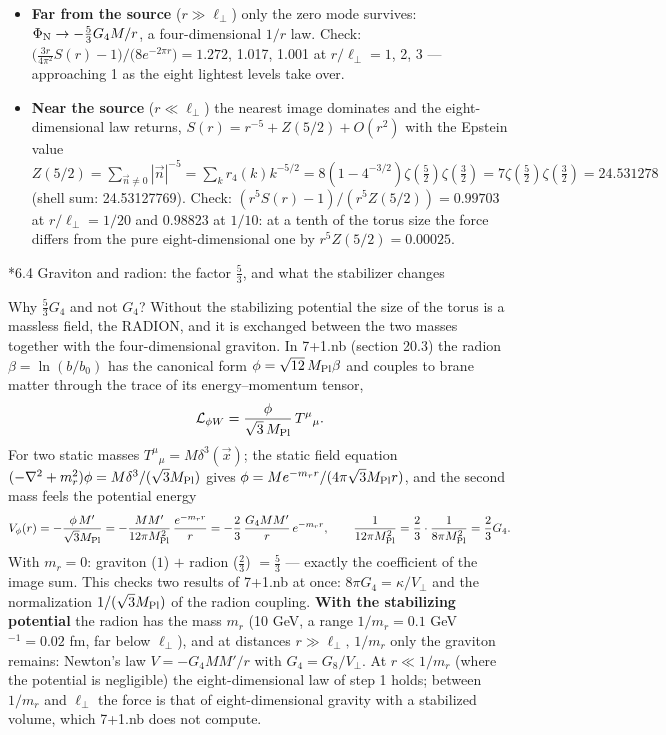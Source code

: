 \documentclass[10pt,a4paper]{article}
\makeatletter
\renewcommand\subsection{\@startsection{subsection}{2}{\z@}{-3.25ex\@plus -1ex \@minus -.2ex}{1.5ex \@plus .2ex}{\normalfont\large\bfseries\raggedright}}
\makeatother
\begin{document}
\begin{itemize}
\item \textbf{Far from the source} ($r\gg\ell_\perp$) only the zero mode survives: $\Phi_{\rm N}\to-\frac53G_4M/r$, a four-dimensional $1/r$ law. Check: $\big(\frac{3r}{4\pi^2}S(r)-1\big)\big/\big(8e^{-2\pi r}\big)=1.272$, 1.017, 1.001 at $r/\ell_\perp=1$, 2, 3 — approaching 1 as the eight lightest levels take over.
\item \textbf{Near the source} ($r\ll\ell_\perp$) the nearest image dominates and the eight-dimensional law returns, $S(r)=r^{-5}+Z(5/2)+O(r^2)$ with the Epstein value $Z(5/2)=\sum_{\vec n\ne0}|\vec n|^{-5}=\sum_kr_4(k)k^{-5/2}=8(1-4^{-3/2})\zeta(\tfrac52)\zeta(\tfrac32)=7\zeta(\tfrac52)\zeta(\tfrac32)=24.531278$ (shell sum: 24.53127769). Check: $(r^5S(r)-1)/(r^5Z(5/2))=0.99703$ at $r/\ell_\perp=1/20$ and 0.98823 at $1/10$: at a tenth of the torus size the force differs from the pure eight-dimensional one by $r^5Z(5/2)=0.00025$.
\end{itemize}
\subsection*{6.4 Graviton and radion: the factor \texorpdfstring{$\frac53$}{53}, and what the stabilizer changes}
Why $\frac53G_4$ and not $G_4$? Without the stabilizing potential the size of the torus is a massless field, the RADION, and it is exchanged between the two masses together with the four-dimensional graviton. In 7+1.nb (section 20.3) the radion $\beta=\ln(b/b_0)$ has the canonical form $\phi=\sqrt{12}\,M_{\rm Pl}\beta$ and couples to brane matter through the trace of its energy–momentum tensor,
\begin{equation*}
\mathcal L_{\phi W}=\frac{\phi}{\sqrt3\,M_{\rm Pl}}\,T^\mu{}_\mu .
\end{equation*}
For two static masses $T^\mu{}_\mu=M\delta^3(\vec x)$; the static field equation $(-\nabla^2+m_r^2)\phi=M\delta^3/(\sqrt3M_{\rm Pl})$ gives $\phi=Me^{-m_rr}/(4\pi\sqrt3M_{\rm Pl}r)$, and the second mass feels the potential energy
\begin{equation*}
V_\phi(r)=-\frac{\phi\,M'}{\sqrt3M_{\rm Pl}}=-\frac{MM'}{12\pi M_{\rm Pl}^2}\,\frac{e^{-m_rr}}r=-\frac23\,\frac{G_4MM'}{r}\,e^{-m_rr},\qquad \frac1{12\pi M_{\rm Pl}^2}=\frac23\cdot\frac1{8\pi M_{\rm Pl}^2}=\frac23G_4 .
\end{equation*}
With $m_r=0$: graviton ($1$) $+$ radion ($\frac23$) $=\frac53$ — exactly the coefficient of the image sum. This checks two results of 7+1.nb at once: $8\pi G_4=\kappa/V_\perp$ and the normalization $1/(\sqrt3M_{\rm Pl})$ of the radion coupling. \textbf{With the stabilizing potential} the radion has the mass $m_r$ (10 GeV, a range $1/m_r=0.1$ GeV$^{-1}=0.02$ fm, far below $\ell_\perp$), and at distances $r\gg\ell_\perp,\,1/m_r$ only the graviton remains: Newton’s law $V=-G_4MM'/r$ with $G_4=G_8/V_\perp$. At $r\ll1/m_r$ (where the potential is negligible) the eight-dimensional law of step 1 holds; between $1/m_r$ and $\ell_\perp$ the force is that of eight-dimensional gravity with a stabilized volume, which 7+1.nb does not compute.
\end{document}
